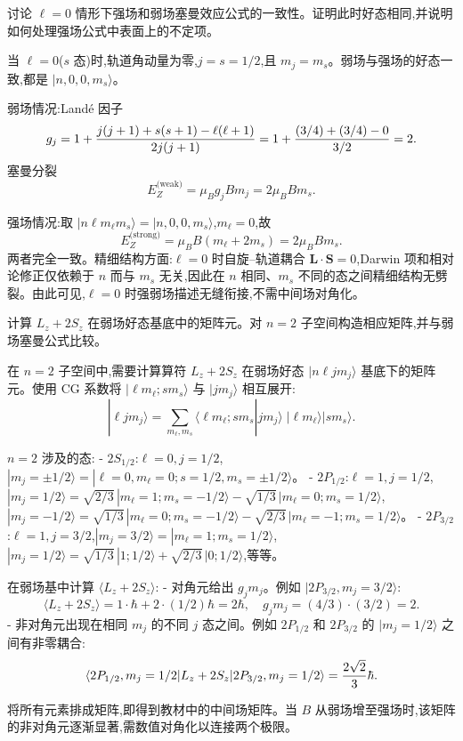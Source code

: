 \begin{question}
讨论 $\ell=0$ 情形下强场和弱场塞曼效应公式的一致性。证明此时好态相同,并说明如何处理强场公式中表面上的不定项。
\end{question}
\begin{solution}
当 $\ell=0$($s$ 态)时,轨道角动量为零,$j=s=1/2$,且 $m_j=m_s$。弱场与强场的好态一致,都是 $|n,0,0,m_s\rangle$。

弱场情况:Land\'e 因子
\[
g_j = 1+{j(j+1)+s(s+1)-\ell(\ell+1)\over2j(j+1)}
= 1+{(3/4)+(3/4)-0\over3/2}=2.
\]
塞曼分裂
\[
E_Z^{\text{(weak)}} = \mu_B g_j B m_j = 2\mu_B B m_s.
\]

强场情况:取 $|n\ell m_\ell m_s\rangle = |n,0,0,m_s\rangle$,$m_\ell=0$,故
\[
E_Z^{\text{(strong)}} = \mu_B B(m_\ell+2m_s) = 2\mu_B B m_s.
\]
两者完全一致。精细结构方面:$\ell=0$ 时自旋--轨道耦合 $\mathbf L\cdot\mathbf S=0$,Darwin 项和相对论修正仅依赖于 $n$ 而与 $m_s$ 无关,因此在 $n$ 相同、$m_s$ 不同的态之间精细结构无劈裂。由此可见,$\ell=0$ 时强弱场描述无缝衔接,不需中间场对角化。
\end{solution}

\begin{question}
计算 $L_z+2S_z$ 在弱场好态基底中的矩阵元。对 $n=2$ 子空间构造相应矩阵,并与弱场塞曼公式比较。
\end{question}
\begin{solution}
在 $n=2$ 子空间中,需要计算算符 $L_z+2S_z$ 在弱场好态 $|n\ell j m_j\rangle$ 基底下的矩阵元。使用 CG 系数将 $|\ell m_\ell; s m_s\rangle$ 与 $|j m_j\rangle$ 相互展开:
\[
|\ell j m_j\rangle = \sum_{m_\ell,m_s} \langle \ell m_\ell; s m_s|j m_j\rangle\; |\ell m_\ell\rangle|s m_s\rangle.
\]

$n=2$ 涉及的态:
- $2S_{1/2}$:$\ell=0,j=1/2$,$|m_j=\pm1/2\rangle = |\ell=0,m_\ell=0; s=1/2,m_s=\pm1/2\rangle$。
- $2P_{1/2}$:$\ell=1,j=1/2$,$|m_j=1/2\rangle = \sqrt{2/3}\,|m_\ell=1;m_s=-1/2\rangle - \sqrt{1/3}\,|m_\ell=0;m_s=1/2\rangle$,$|m_j=-1/2\rangle = \sqrt{1/3}\,|m_\ell=0;m_s=-1/2\rangle - \sqrt{2/3}\,|m_\ell=-1;m_s=1/2\rangle$。
- $2P_{3/2}$:$\ell=1,j=3/2$,$|m_j=3/2\rangle=|m_\ell=1;m_s=1/2\rangle$,$|m_j=1/2\rangle = \sqrt{1/3}\,|1;1/2\rangle+\sqrt{2/3}\,|0;1/2\rangle$,等等。

在弱场基中计算 $\langle L_z+2S_z\rangle$:
- 对角元给出 $g_j m_j$。例如 $|2P_{3/2},m_j=3/2\rangle$:
  \[
  \langle L_z+2S_z\rangle = 1\cdot\hbar + 2\cdot(1/2)\hbar = 2\hbar,\quad
  g_j m_j = (4/3)\cdot(3/2)=2.
  \]
- 非对角元出现在相同 $m_j$ 的不同 $j$ 态之间。例如 $2P_{1/2}$ 和 $2P_{3/2}$ 的 $|m_j=1/2\rangle$ 之间有非零耦合:
  \[
  \langle 2P_{1/2},m_j=1/2|L_z+2S_z|2P_{3/2},m_j=1/2\rangle = {2\sqrt2\over3}\hbar.
  \]

将所有元素排成矩阵,即得到教材中的中间场矩阵。当 $B$ 从弱场增至强场时,该矩阵的非对角元逐渐显著,需数值对角化以连接两个极限。
\end{solution}

